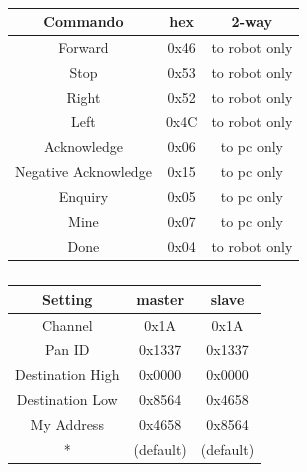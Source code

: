 \documentclass{report}
\begin{document}
\begin{table}
\centering
\caption{}
\begin{subtable}{0.48\textwidth}
\label{tab:comProtocol}
\centering
\begin{tabular}{|c|c|c|}
\hline
\textbf{Commando} & \textbf{hex} & \textbf{2-way} \\
\hline
Forward				& 0x46 	& to robot only\\
\hline
Stop 					& 0x53 	& to robot only\\
\hline
Right 				& 0x52 	& to robot only\\
\hline
Left 					& 0x4C 	& to robot only\\
\hline
Acknowledge 			& 0x06	& to pc only\\
\hline
Negative Acknowledge 	& 0x15	& to pc only\\
\hline
Enquiry 				& 0x05	& to pc only\\
\hline
Mine 					& 0x07	& to pc only\\
\hline
Done 				& 0x04	& to robot only\\
\hline
\end{tabular}
\end{subtable}
\quad
\begin{subtable}{0.48\textwidth}
\label{tab:xBeeSettings}
\centering
\begin{tabular}{|c|c|c|}
\hline
\textbf{Setting} & \textbf{master}& \textbf{slave} \\
\hline
Channel				& 0x1A 	& 0x1A\\
\hline
Pan ID				& 0x1337 	& 0x1337\\
\hline
Destination High			& 0x0000	& 0x0000\\
\hline
Destination Low			& 0x8564 	& 0x4658\\
\hline
My Address			& 0x4658 	& 0x8564\\
\hline
*		 			& (default)	&(default)\\
\hline
\end{tabular}
\end{subtable}
\end{table}
\end{document}
